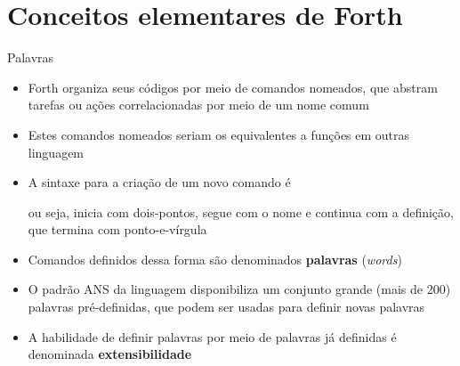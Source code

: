 \section{Conceitos elementares de Forth}

\begin{frame}[fragile]{Palavras}

    \begin{itemize}
        \item Forth organiza seus códigos por meio de comandos nomeados, que abstram tarefas
            ou ações correlacionadas por meio de um nome comum

        \item Estes comandos nomeados seriam os equivalentes a funções em outras linguagem

        \item A sintaxe para a criação de um novo comando é

        
        ou seja, inicia com dois-pontos, segue com o nome e continua com a definição, que termina
        com ponto-e-vírgula

        \item Comandos definidos dessa forma são denominados \textbf{palavras} (\textit{words})

        \item O padrão ANS da linguagem disponibiliza um conjunto grande (mais de 200) palavras
            pré-definidas, que podem ser usadas para definir novas palavras

        \item A habilidade de definir palavras por meio de palavras já definidas é denominada
            \textbf{extensibilidade}
    \end{itemize}

\end{frame}
